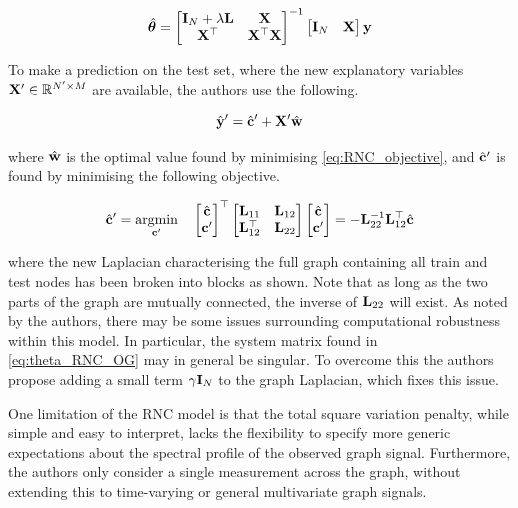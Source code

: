 \begin{equation}
    \label{eq:theta_RNC_OG}
    \hat{\boldsymbol{\theta}} = \begin{bmatrix}
        \mathbf{I}_N + \lambda \mathbf{L} & \mathbf{X} \\ \mathbf{X}^\top & \mathbf{X}^\top \mathbf{X}
    \end{bmatrix}^{-1} \begin{bmatrix}
        \mathbf{I}_N & \mathbf{X}
    \end{bmatrix} \mathbf{y}
\end{equation}

To make a prediction on the test set, where the new explanatory variables $\mathbf{X}' \in \mathbb{R}^{N' \times M}$ are available, the authors use the following. 

\begin{equation}
    \hat{\mathbf{y}}' = \hat{\mathbf{c}}' + \mathbf{X}' \hat{\mathbf{w}}
\end{equation}

where $\hat{\mathbf{w}}$ is the optimal value found by minimising \cref{eq:RNC_objective}, and $\hat{\mathbf{c}}'$ is found by minimising the following objective. 

\begin{equation}
    \hat{\mathbf{c}}' = \underset{\mathbf{c}'}{\text{argmin}} \quad \begin{bmatrix}
        \hat{\mathbf{c}} \\ \mathbf{c}' 
    \end{bmatrix}^\top \begin{bmatrix}
        \mathbf{L}_{11} & \mathbf{L}_{12} \\ \mathbf{L}_{12}^\top & \mathbf{L}_{22}
    \end{bmatrix} \begin{bmatrix}
        \hat{\mathbf{c}} \\ \mathbf{c}' 
    \end{bmatrix} = - \mathbf{L}_{22}^{-1} \mathbf{L}_{12}^\top \hat{\mathbf{c}}
\end{equation}

where the new Laplacian characterising the full graph containing all train and test nodes has been broken into blocks as shown. Note that as long as the two parts of the graph are mutually connected, the inverse of $\mathbf{L}_{22}$ will exist. As noted by the authors, there may be some issues surrounding computational robustness within this model. In particular, the system matrix found in \cref{eq:theta_RNC_OG} may in general be singular. To overcome this the authors propose adding a small term $\gamma \mathbf{I}_N$ to the graph Laplacian, which fixes this issue. 

One limitation of the RNC model is that the total square variation penalty, while simple and easy to interpret, lacks the flexibility to specify more generic expectations about the spectral profile of the observed graph signal. Furthermore, the authors only consider a single measurement across the graph, without extending this to time-varying or general multivariate graph signals. 


